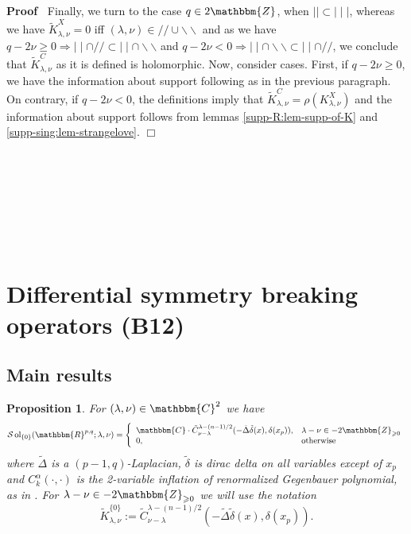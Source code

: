 \documentclass[12pt]{article}
\newcommand{\assign}{:=}
\newcommand{\tmop}[1]{\ensuremath{\operatorname{#1}}}
\renewenvironment{proof}{\noindent\textbf{Proof\ }}{\hspace*{\fill}$\Box$\medskip}
\newtheorem{proposition}{Proposition}[section]
\theoremstyle{remark}
\begin{document}
\begin{proof}
  Finally, we turn to the case $q \in 2\mathbbm{Z}$, when $\mid \mid \subset
  \mid \mid \mid$, whereas we have $\tilde{K}_{\lambda, \nu}^X = 0$ iff
  $(\lambda, \nu) \in / / \cup \backslash\backslash$ and as we have $q - 2 \nu
  \geqslant 0 \Rightarrow \mid \mid \cap / / \subset \mid \mid \cap
  \backslash\backslash$ and $q - 2 \nu < 0 \Rightarrow \mid \mid \cap
  \backslash\backslash \subset \mid \mid \cap / /$, we conclude that
  $\tilde{K}_{\lambda, \nu}^C$ as it is defined is holomorphic. Now, consider
  cases. First, if $q - 2 \nu \geqslant 0$, we have the information about
  support following as in the previous paragraph. On contrary, if $q - 2 \nu <
  0$, the definitions imply that $\tilde{K}_{\lambda, \nu}^C = \rho
  (K_{\lambda, \nu}^X)$ and the information about support follows from lemmas
  \ref{supp-R:lem-supp-of-K} and \ref{supp-sing:lem-strangelove}.
\end{proof}

\

\

\

\

\section{Differential symmetry breaking operators (B12)}\label{sec:diffSBO}

\subsection{Main results}

\begin{proposition}
  \label{diffSBO:prop-main}For $(\lambda, \nu) \in \mathbbm{C}^2$ we have
  \[ \mathcal{S} \tmop{ol}_{\{ 0 \}} (\mathbbm{R}^{p, q} ; \lambda, \nu) =
     \left\{ \begin{array}{ll}
       \mathbbm{C} \cdot \tilde{C}_{\nu - \lambda}^{\lambda - (n - 1) / 2} (-
       \tilde{\Delta} \tilde{\delta} (x), \delta (x_p)), & \lambda - \nu \in -
       2\mathbbm{Z}_{\geqslant 0}\\
       0, & \tmop{otherwise}
     \end{array} \right. \]
  where $\tilde{\Delta}$ is a $(p - 1, q)$-Laplacian, $\tilde{\delta}$ is
  dirac delta on all variables except of $x_p$ and $C^{\alpha}_k (\cdot,
  \cdot)$ is the 2-variable inflation of renormalized Gegenbauer polynomial,
  as in {\cite[(16.3)]{kobayashi2015symmetry}}. For $\lambda - \nu \in -
  2\mathbbm{Z}_{\geqslant 0}$ we will use the notation
  \[ \tilde{K}_{\lambda, \nu}^{\{ 0 \}} \assign \tilde{C}_{\nu -
     \lambda}^{\lambda - (n - 1) / 2} (- \tilde{\Delta} \tilde{\delta} (x),
     \delta (x_p)) . \]
\end{proposition}
\end{document}
